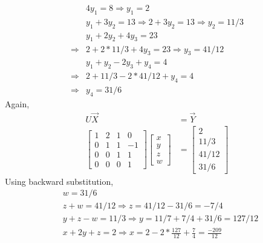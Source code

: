 \documentclass{report}
\begin{document}
{\begin{align*}
    & 4y_1 =8 \Rightarrow y_1 =2\\
    & y_1+3y_2 = 13 \Rightarrow 2+3y_2 = 13\Rightarrow y_2=11/3\\
    & y_1+2y_2+4y_3=23\\
    \Rightarrow & 2+2*11/3+4y_3 = 23\Rightarrow y_3 = 41 /12\\
    & y_1+y_2-2y_3+y_4=4\\
    \Rightarrow & 2+11/3-2*41/12+y_4=4\\
    \Rightarrow & y_4 = 31/6
\end{align*}
Again,
\begin{align*}
    U\vec{X}&=\vec{Y}\\
    \begin{bmatrix}            
        1& 2& 1& 0\\
        0& 1& 1& -1\\
        0&0&1&1\\
        0&0&0&1
    \end{bmatrix} 
    \begin{bmatrix}
        x\\y\\z\\w
    \end{bmatrix} & = \begin{bmatrix}
        2\\11/3\\41/12\\31/6
    \end{bmatrix}
\end{align*}
Using backward substitution,
\begin{align*}
    & w= 31/6\\
    & z+w=41/12\Rightarrow z=41/12-31/6=-7/4\\
    & y+z-w = 11/3\Rightarrow y = 11/7+7/4+31/6= 127/12\\
    & x+2y+z=2\Rightarrow x=2-2*\frac{127}{12}+\frac{7}{4}=\frac{-209}{12}
\end{align*}
}
\end{document}
